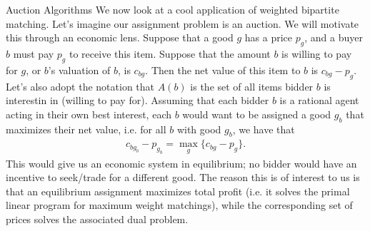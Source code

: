 \begin{section}{Auction Algorithms}
	We now look at a cool application of weighted bipartite matching. Let's imagine our assignment 
	problem is an auction. We will motivate this through an economic lens. Suppose that a good $g$ 
	has a price $p_g$, and a buyer $b$ must pay $p_g$ to receive this item. Suppose that the 
	amount $b$ is willing to pay for $g$, or $b$'s valuation of $b$, is $c_{bg}$. Then the net value 
	of this item to $b$ is $c_{bg} - p_g$. Let's also adopt the notation that $A(b)$ is the set of 
	all items bidder $b$ is interestin in (willing to pay for). 
	Assuming that each bidder $b$ is a rational agent acting 
	in their own best interest, each $b$ would want to be assigned a good $g_b$ that maximizes their 
	net value, i.e. for all $b$ with good $g_b$, we have that 
	\begin{align}
		c_{bg_b} - p_{g_b} = \max_g \{c_{bg} - p_g \}.
	\end{align}
	This would give us an economic system in equilibrium; no bidder would have an incentive to 
	seek/trade for a different good.  
	The reason this is of interest to us is that an equilibrium assignment maximizes total 
	profit (i.e. it solves the primal linear program for maximum weight matchings), while the 
	corresponding set of prices solves the associated dual problem.


\end{section}
